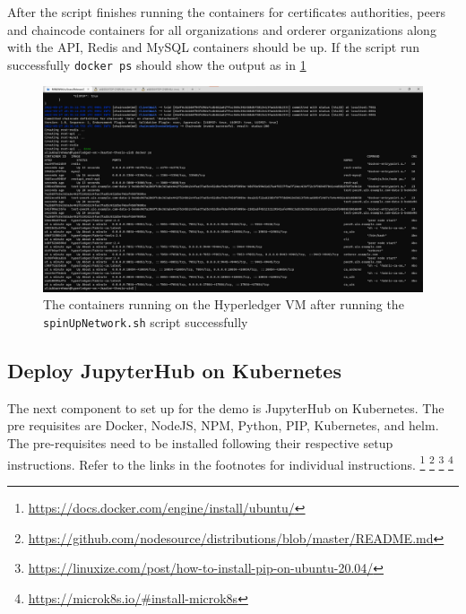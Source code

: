 After the script finishes running the containers for certificates authorities, peers and chaincode containers for all organizations and orderer organizations along with the API, Redis and MySQL containers should be up. If the script run successfully \lstinline{docker ps} should show the output as in \ref{fig:vm-containers}

\begin{figure}
    \centering
    \includegraphics[width=14cm,keepaspectratio]{photos/Hyperledger-vm.png}
    \caption{The containers running on the Hyperledger VM after running the \lstinline{spinUpNetwork.sh} script successfully}
    \label{fig:vm-containers}
\end{figure}

\subsection{Deploy JupyterHub on Kubernetes}
The next component to set up for the demo is JupyterHub on Kubernetes. The pre requisites are Docker, NodeJS, NPM, Python, PIP, Kubernetes, and helm. The pre-requisites need to be installed following their respective setup instructions. Refer to the links in the footnotes for individual instructions.
\footnote{\url{https://docs.docker.com/engine/install/ubuntu/}}
\footnote{\url{https://github.com/nodesource/distributions/blob/master/README.md}}
\footnote{\url{https://linuxize.com/post/how-to-install-pip-on-ubuntu-20.04/}}
\footnote{\url{https://microk8s.io/\#install-microk8s}}


